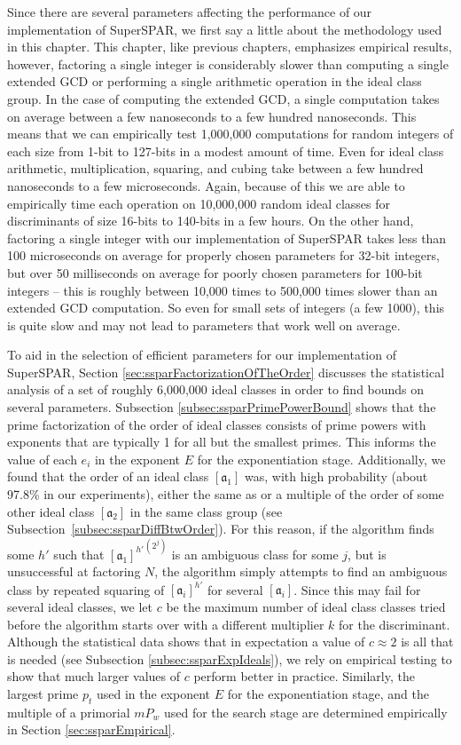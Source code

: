 \documentclass{ucalgthes1}
\theoremstyle{definition}
\newcommand{\ideal}{\mathfrak}
\begin{document}
Since there are several parameters affecting the performance of our implementation of SuperSPAR, we first say a little about the methodology used in this chapter.  This chapter, like previous chapters, emphasizes empirical results, however, factoring a single integer is considerably slower than computing a single extended GCD or performing a single arithmetic operation in the ideal class group.  In the case of computing the extended GCD, a single computation takes on average between a few nanoseconds to a few hundred nanoseconds.  This means that we can empirically test 1,000,000 computations for random integers of each size from 1-bit to 127-bits in a modest amount of time.  Even for ideal class arithmetic, multiplication, squaring, and cubing take between a few hundred nanoseconds to a few microseconds.  Again, because of this we are able to empirically time each operation on 10,000,000 random ideal classes for discriminants of size 16-bits to 140-bits in a few hours.  On the other hand, factoring a single integer with our implementation of SuperSPAR takes less than 100 microseconds on average for properly chosen parameters for 32-bit integers, but over 50 milliseconds on average for poorly chosen parameters for 100-bit integers -- this is roughly between 10,000 times to 500,000 times slower than an extended GCD computation.  So even for small sets of integers (a few 1000), this is quite slow and may not lead to parameters that work well on average.

To aid in the selection of efficient parameters for our implementation of SuperSPAR, Section \ref{sec:ssparFactorizationOfTheOrder} discusses the statistical analysis of a set of roughly 6,000,000 ideal classes in order to find bounds on several parameters.  Subsection \ref{subsec:ssparPrimePowerBound} shows that the prime factorization of the order of ideal classes consists of prime powers with exponents that are typically 1 for all but the smallest primes.  This informs the value of each $e_i$ in the exponent $E$ for the exponentiation stage.  Additionally, we found that the order of an ideal class $[\ideal a_1]$ was, with high probability (about 97.8\% in our experiments), either the same as or a multiple of the order of some other ideal class $[\mathfrak a_2]$ in the same class group (see Subsection~\ref{subsec:ssparDiffBtwOrder}).  For this reason, if the algorithm finds some $h'$ such that ${[\mathfrak a_1]^{h'}}^{\left(2^j\right)}$ is an ambiguous class for some $j$, but is unsuccessful at factoring $N$, the algorithm simply attempts to find an ambiguous class by repeated squaring of $[\mathfrak a_i]^{h'}$ for several $[\mathfrak a_i]$.  Since this may fail for several ideal classes, we let $c$ be the maximum number of ideal class classes tried before the algorithm starts over with a different multiplier $k$ for the discriminant.  Although the statistical data shows that in expectation a value of $c \approx 2$ is all that is needed (see Subsection \ref{subsec:ssparExpIdeals}), we rely on empirical testing to show that much larger values of $c$ perform better in practice.  Similarly, the largest prime $p_t$ used in the exponent $E$ for the exponentiation stage, and the multiple of a primorial $mP_w$ used for the search stage are determined empirically in Section \ref{sec:ssparEmpirical}.
\end{document}

